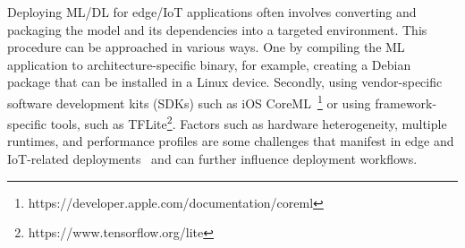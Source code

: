 
Deploying ML/DL for edge/IoT applications often involves converting and packaging the model and its dependencies into a targeted environment. This procedure can be approached in various ways. One by compiling the ML application to architecture-specific binary, for example, creating a Debian package that can be installed in a Linux device. Secondly, using vendor-specific software development kits (SDKs) such as iOS CoreML~\footnote{https://developer.apple.com/documentation/coreml} or using framework-specific tools, such as TFLite\footnote{https://www.tensorflow.org/lite}. Factors such as hardware heterogeneity, multiple runtimes, and performance profiles are some challenges that manifest in edge and IoT-related deployments~\cite{Wu-FB-edge} and can further influence deployment workflows.

